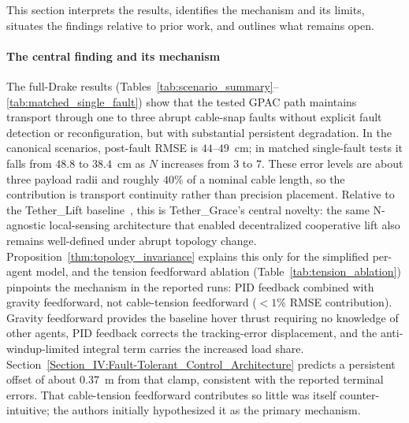 This section interprets the results, identifies the mechanism and its limits, situates the findings relative to prior work, and outlines what remains open.

\paragraph*{The central finding and its mechanism}
The full-Drake results (Tables~\ref{tab:scenario_summary}--\ref{tab:matched_single_fault}) show that the tested GPAC path maintains transport through one to three abrupt cable-snap faults without explicit fault detection or reconfiguration, but with substantial persistent degradation. In the canonical scenarios, post-fault RMSE is $44$--$49$~cm; in matched single-fault tests it falls from $48.8$ to $38.4$~cm as $N$ increases from $3$ to $7$. These error levels are about three payload radii and roughly $40\%$ of a nominal cable length, so the contribution is transport continuity rather than precision placement. Relative to the Tether\_Lift baseline~\cite{hajieghrary2026tetherlift}, this is Tether\_Grace's central novelty: the same N-agnostic local-sensing architecture that enabled decentralized cooperative lift also remains well-defined under abrupt topology change. Proposition~\ref{thm:topology_invariance} explains this only for the simplified per-agent model, and the tension feedforward ablation (Table~\ref{tab:tension_ablation}) pinpoints the mechanism in the reported runs: PID feedback combined with gravity feedforward, not cable-tension feedforward ($<\!1\%$ RMSE contribution). Gravity feedforward provides the baseline hover thrust requiring no knowledge of other agents, PID feedback corrects the tracking-error displacement, and the anti-windup-limited integral term carries the increased load share. Section~\ref{Section_IV:Fault-Tolerant_Control_Architecture} predicts a persistent offset of about $0.37$~m from that clamp, consistent with the reported terminal errors. That cable-tension feedforward contributes so little was itself counter-intuitive; the authors initially hypothesized it as the primary mechanism.

